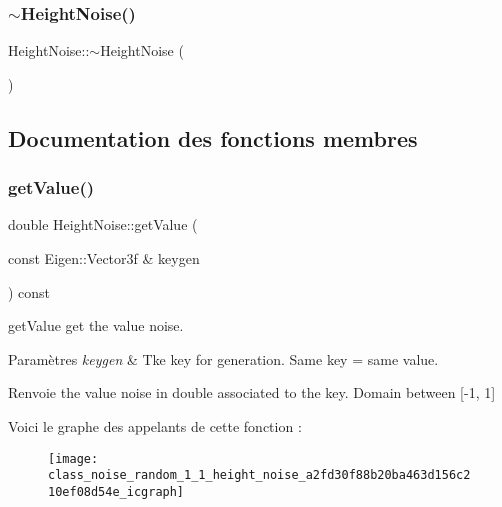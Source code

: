 \subsubsection{\texorpdfstring{$\sim$\+Height\+Noise()}{~HeightNoise()}}
{\footnotesize\ttfamily Height\+Noise\+::$\sim$\+Height\+Noise (\begin{DoxyParamCaption}{ }\end{DoxyParamCaption})}



\subsection{Documentation des fonctions membres}
\mbox{\label{class_noise_random_1_1_height_noise_a2fd30f88b20ba463d156c210ef08d54e}} 
\subsubsection{\texorpdfstring{get\+Value()}{getValue()}}
{\footnotesize\ttfamily double Height\+Noise\+::get\+Value (\begin{DoxyParamCaption}\item[{const Eigen\+::\+Vector3f \&}]{keygen }\end{DoxyParamCaption}) const}



get\+Value get the value noise. 


\begin{DoxyParams}{Paramètres}
{\em keygen} & Tke key for generation. Same key = same value. \\
\hline
\end{DoxyParams}
\begin{DoxyReturn}{Renvoie}
the value noise in double associated to the key. Domain between \mbox{[}-\/1, 1\mbox{]} 
\end{DoxyReturn}
Voici le graphe des appelants de cette fonction \+:\nopagebreak
\begin{figure}[H]
\begin{center}
\leavevmode
\texttt{[image: class\_noise\_random\_1\_1\_height\_noise\_a2fd30f88b20ba463d156c210ef08d54e\_icgraph]}
\end{center}
\end{figure}


